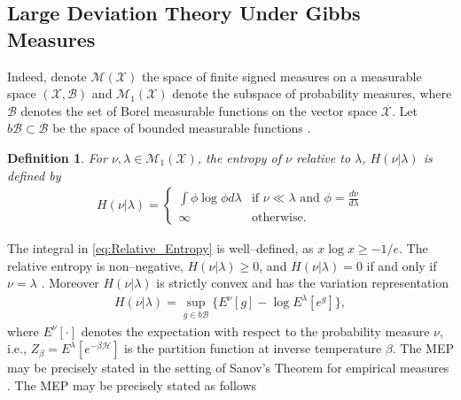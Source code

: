 \documentclass[english,12pt]{ttuthes}
\newtheorem{definition}{Definition}[chapter]
\newcommand{\Hc}{\mathcal{H}}
\begin{document}
\subsection{Large Deviation Theory Under Gibbs Measures}
\label{subsec:LDT_Gibbs}
%
Indeed, denote
$\mathcal{M}(\mathcal{X})$ the space of finite signed measures on a
measurable space $(\mathcal{X},\mathscr{B})$ and
$\mathcal{M}_1(\mathcal{X})$ denote the subspace of probability
measures, where $\mathscr{B}$ denotes the set of Borel measurable
functions on the vector space $\mathcal{X}$. Let
$b\mathscr{B}\subset\mathscr{B}$ be the space of bounded measurable
functions \cite{Firas}.
%
\begin{definition}
  For $\nu,\lambda\in\mathcal{M}_1(\mathcal{X})$, the entropy of $\nu$ relative to
  $\lambda$, $H(\nu|\lambda)$ is defined by
  \begin{align}\label{eq:Relative_Entropy}
   H(\nu|\lambda)=\left\{
        \begin{array}{ll}
           \int\phi\log{\phi}d\lambda & \text{if } \nu\ll\lambda \text{ and }
                                         \phi=\frac{d\nu}{d\lambda} \\
           \infty          &  \text{otherwise.}                  
        \end{array}
        \right.
  \end{align}
\end{definition}
%
The integral in \eqref{eq:Relative_Entropy} is well--defined, as
$x\log{x}\geq-1/e$. The relative entropy is non--negative, $H(\nu|\lambda)\geq0$, and
$H(\nu|\lambda)=0$ if and only if $\nu=\lambda$ \cite{Firas}. Moreover $H(\nu|\lambda)$ is
strictly convex and has the variation representation \cite{Firas}
%
\begin{align}
  H(\nu|\lambda)=\sup_{g\in b\mathscr{B}}\{E^\nu[g]-\log{E^\lambda[e^g]}\},
\end{align}
%
where $E^\nu[\cdot]$ denotes the expectation with respect to the probability
measure $\nu$, i.e., $Z_\beta=E^\lambda[e^{-\beta\Hc}]$ is the partition
function at inverse temperature $\beta$. The MEP may be precisely stated
in the setting of Sanov's Theorem for empirical measures
\cite{Firas}. The MEP may be precisely stated as follows
\end{document}
